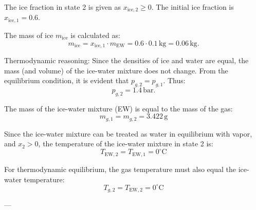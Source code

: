 The ice fraction in state 2 is given as \( x_{\text{ice},2} \geq 0 \). The initial ice fraction is \( x_{\text{ice},1} = 0.6 \).  

The mass of ice \( m_{\text{ice}} \) is calculated as:  
\[
m_{\text{ice}} = x_{\text{ice},1} \cdot m_{\text{EW}} = 0.6 \cdot 0.1 \, \text{kg} = 0.06 \, \text{kg}.
\]  

Thermodynamic reasoning:  
Since the densities of ice and water are equal, the mass (and volume) of the ice-water mixture does not change. From the equilibrium condition, it is evident that \( p_{g,2} = p_{g,1} \). Thus:  
\[
p_{g,2} = 1.4 \, \text{bar}.
\]

The mass of the ice-water mixture (EW) is equal to the mass of the gas:  
\[
m_{g,1} = m_{g,2} = 3.422 \, \text{g}
\]  

Since the ice-water mixture can be treated as water in equilibrium with vapor, and \( x_2 > 0 \), the temperature of the ice-water mixture in state 2 is:  
\[
T_{\text{EW},2} = T_{\text{EW},1} = 0^\circ\text{C}
\]  

For thermodynamic equilibrium, the gas temperature must also equal the ice-water temperature:  
\[
T_{g,2} = T_{\text{EW},2} = 0^\circ\text{C}
\]  

---